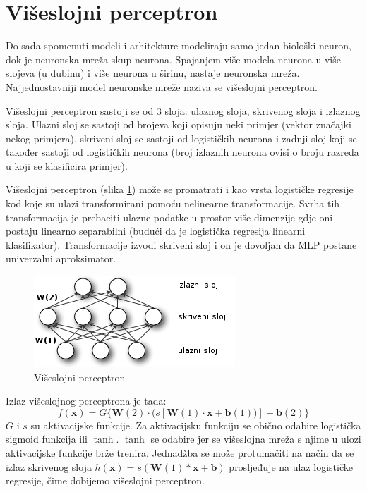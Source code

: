 \documentclass[times, utf8, diplomski, numeric]{fer}
\begin{document}
\section{Višeslojni perceptron}
\label{chap:viseslojni_perceptron}

Do sada spomenuti modeli i arhitekture modeliraju samo jedan biološki neuron, dok je neuronska mreža skup neurona. Spajanjem više modela neurona u više slojeva (u dubinu) i više neurona u širinu, nastaje neuronska mreža. Najjednostavniji model neuronske mreže naziva se višeslojni perceptron.

Višeslojni perceptron sastoji se od 3 sloja: ulaznog sloja, skrivenog sloja  i izlaznog sloja. Ulazni sloj se sastoji od brojeva koji opisuju neki primjer (vektor značajki nekog primjera), skriveni sloj se sastoji od logističkih neurona i zadnji sloj koji se također sastoji od logističkih neurona (broj izlaznih neurona ovisi o broju razreda u koji se klasificira primjer).

Višeslojni perceptron (slika \ref{fig:mlp}) može se promatrati i kao vrsta logističke regresije kod koje su ulazi transformirani pomoću nelinearne transformacije. Svrha tih transformacija je prebaciti ulazne podatke u prostor više dimenzije gdje oni postaju linearno separabilni (budući da je logistička regresija linearni klasifikator). Transformacije izvodi skriveni sloj i on je dovoljan da MLP postane univerzalni aproksimator. \cite{Hornik-1991}

\begin{figure}[htb]
\centering
\includegraphics{imgs/mlp.png}
\caption{Višeslojni perceptron}
\label{fig:mlp}
\end{figure}

Izlaz višeslojnog perceptrona je tada:
\begin{equation}
f(\boldsymbol{x}) = G\{\boldsymbol{W}(2) \cdot (s[\boldsymbol{W}(1) \cdot \boldsymbol{x} + \boldsymbol{b}(1))] + \boldsymbol{b}(2)\}
\label{eq:conv}
\end{equation}
$G$ i $s$ su aktivacijske funkcije. Za aktivacijsku funkciju se obično odabire logistička sigmoid funkcija ili $\tanh$. $\tanh$ se odabire jer se višeslojna mreža s njime u ulozi aktivacijske funkcije brže trenira.
Jednadžba se može protumačiti na način da se izlaz skrivenog sloja $h(\boldsymbol{x}) = s( \boldsymbol{W}(1) * \boldsymbol{x} + \boldsymbol{b} )$ prosljeđuje na ulaz logističke regresije, čime dobijemo višeslojni perceptron.
\end{document}
